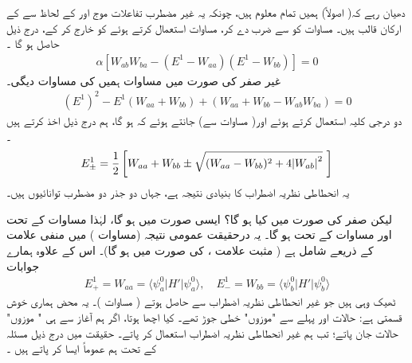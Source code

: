 دھیان رہے کہ( اصولاً)  ہمیں تمام  معلوم ہیں،  چونکہ یہ غیر مضطرب تفاعلات موج  اور  کے لحاظ سے  کے ارکان قالب ہیں۔  مساوات     کو  سے ضرب دے کر،  مساوات    استعمال کرتے ہوئے   کو خارج کر کے،  درج ذیل حاصل ہو گا ۔
\begin{align}\label{مساوات_غیر_مضطرب_پہلا_اچھا_نتیجہ}
\alpha [W_{ab} W_{ba} - (E^1 - W_{aa}) (E^1 - W_{bb})] = 0
\end{align}
غیر صفر  کی صورت میں مساوات    ہمیں  کی مساوات دیگی۔ 
\begin{align}\label{مساوات_غیر_مضطرب_امتیازی_مساوات}
(E^1)^2 - E^1 (W_{aa} + W_{bb}) + (W_{aa} + W_{bb} - W_{ab} W_{ba}) = 0
\end{align}
دو درجی کلیہ استعمال کرتے ہوئے اور( مساوات   سے)  جانتے ہوئے کہ   ہو گا،  ہم درج ذیل اخذ کرتے ہیں ۔
\begin{align}\label{مساوات_غیر_مضطرب_مضطرب_تونائیاں}
E_{\pm}^1 = \frac{1}{2} \left[W_{aa} + W_{bb} \pm \sqrt{(W_{aa} - W_{bb})^2 + 4 \abs{W_{ab}}^2} \,\,\right ]
\end{align}
یہ انحطاطی نظریہ اضطراب کا بنیادی نتیجہ ہے، جہاں دو  جذر دو مضطرب توانائیوں   ہیں۔

 لیکن صفر  کی صورت میں کیا ہو گا؟ ایسی صورت میں  ہو گا، لہٰذا     مساوات    کے تحت  اور مساوات   کے تحت  ہو گا۔ یہ درحقیقت  عمومی نتیجہ  (مساوات )   میں منفی علامت کے ذریعے  شامل ہے ( مثبت علامت ،  کی صورت میں ہو گا)۔ اس کے علاوہ ہمارے جوابات 
\begin{align*}
E_{+}^1 = W_{aa} = \langle \psi_a^0 | H' | \psi_a^0 \rangle, \quad E_{-}^1 = W_{bb} = \langle \psi_b^0 | H' | \psi_b^0 \rangle
\end{align*}
ٹھیک وہی ہیں جو  غیر انحطاطی نظریہ اضطراب سے حاصل  ہوتے ( مساوات  )۔   یہ محض ہماری خوش قسمتی ہے:  حالات  اور  پہلے سے "موزوں" خطی جوڑ تھے۔ کیا اچھا ہوتا،  اگر ہم آغاز سے ہی  " موزوں" حالات جان پاتے؛   تب  ہم غیر انحطاطی نظریہ اضطراب استعمال کر پاتے۔  حقیقت میں درج ذیل مسئلہ کے تحت ہم عموماً ایسا کر پاتے ہیں ۔

